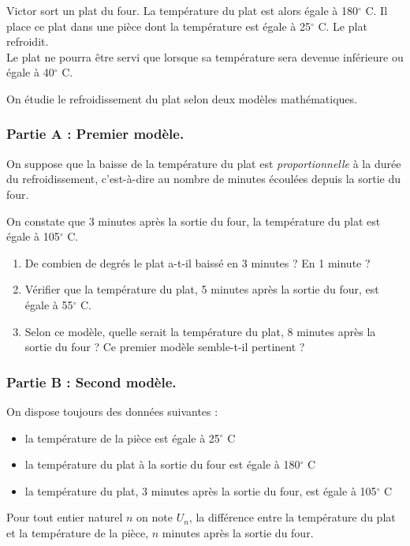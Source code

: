 Victor sort un plat du four. La température du plat est alors égale à 180\ensuremath{^\circ} C. Il place ce plat dans une pièce dont la température est égale à 25\ensuremath{^\circ} C. Le plat refroidit. \\
Le plat ne pourra être servi que lorsque sa température sera devenue inférieure ou égale à 40\ensuremath{^\circ} C.

On étudie le refroidissement du plat selon deux modèles mathématiques.

\subsubsection*{Partie A : Premier modèle.}
On suppose que la baisse de la température du plat est \textit{proportionnelle} à la durée du refroidissement, c'est-à-dire au nombre de minutes écoulées depuis la sortie du four.

On constate que 3 minutes après la sortie du four, la température du plat est égale à 105\ensuremath{^\circ} C.

\begin{enumerate}
\item De combien de degrés le plat a-t-il baissé en 3 minutes ? En 1 minute ?

\item Vérifier que la température du plat, 5 minutes après la sortie du four, est égale à 55\ensuremath{^\circ} C.

\item Selon ce modèle, quelle serait la température du plat, 8 minutes après la sortie du four ? Ce premier modèle semble-t-il pertinent ?
\end{enumerate}

\subsubsection*{Partie B : Second modèle.}
On dispose toujours des données suivantes :
\begin{itemize}
\item la température de la pièce est égale à 25\ensuremath{^\circ} C
\item la température du plat à la sortie du four est égale à 180\ensuremath{^\circ} C
\item la température du plat, 3 minutes après la sortie du four, est égale à 105\ensuremath{^\circ} C
\end{itemize}

Pour tout entier naturel $n$ on note $U_n$, la différence entre la température du plat et la température de la pièce, $n$ minutes après la sortie du four.

